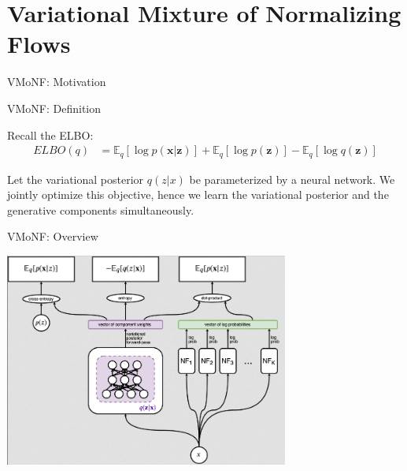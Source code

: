 \documentclass[12pt,ignorenonframetext,]{beamer}
\begin{document}
\hypertarget{variational-mixture-of-normalizing-flows}{%
\section{Variational Mixture of Normalizing
Flows}\label{variational-mixture-of-normalizing-flows}}

\begin{frame}{VMoNF: Motivation}
\protect\hypertarget{vmonf-motivation}{}



\end{frame}

\begin{frame}{VMoNF: Definition}
\protect\hypertarget{vmonf-definition}{}

Recall the ELBO: \begin{align*}
    ELBO(q) &= \mathbb{E}_q [\log p(\bm{x}|\bm{z})] + \mathbb{E}_q [\log p(\bm{z})] - \mathbb{E}_q [\log q(\bm{z})]
\end{align*}

\pause

Let the variational posterior \(q(z|x)\) be parameterized by a neural
network. We jointly optimize this objective, hence we learn the
variational posterior and the generative components simultaneously.

\end{frame}

\begin{frame}{VMoNF: Overview}
\protect\hypertarget{vmonf-overview}{}

\centering

\includegraphics[width=0.7\textwidth]{figures/train_overview.png}

\end{frame}
\end{document}
